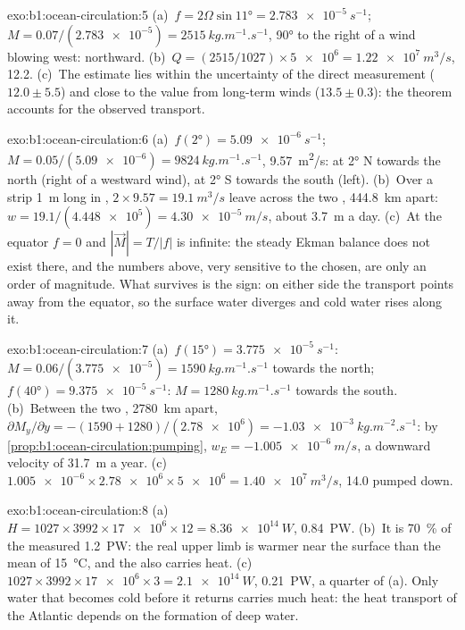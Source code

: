 \begin{solution}{exo:b1:ocean-circulation:5}
(a)~$f = 2\Omega\sin\ang{11} = \qty{2.783e-5}{s^{-1}}$; $M = 0.07/(\num{2.783e-5}) =
\qty{2515}{kg.m^{-1}.s^{-1}}$, \ang{90} to the right of a wind blowing west:
northward. (b)~$Q = (2515/1027) \times \num{5e6} = \qty{1.22e7}{m^3/s}$,
\qty{12.2}{\sverdrup}. (c)~The estimate lies within the uncertainty of the direct
measurement ($12.0 \pm 5.5$) and close to the value from long-term winds
($13.5 \pm 0.3$): the theorem accounts for the observed transport.
\end{solution}

\begin{solution}{exo:b1:ocean-circulation:6}
(a)~$f(\ang{2}) = \qty{5.09e-6}{s^{-1}}$; $M = 0.05/(\num{5.09e-6}) =
\qty{9824}{kg.m^{-1}.s^{-1}}$, \qty{9.57}{m^2/s}: at \ang{2} N towards the north
(right of a westward wind), at \ang{2} S towards the south (left). (b)~Over a strip
\qty{1}{m} long in , $2 \times 9.57 = \qty{19.1}{m^3/s}$ leave across the
two , \qty{444.8}{km} apart: $w = 19.1/(\num{4.448e5}) = \qty{4.30e-5}{m/s}$,
about \qty{3.7}{m} a day. (c)~At the equator $f = 0$ and $|\vec M| = T/|f|$ is
infinite: the steady Ekman balance does not exist there, and the numbers above, very
sensitive to the  chosen, are only an order of magnitude. What survives is
the sign: on either side the transport points away from the equator, so the surface
water diverges and cold water rises along it.
\end{solution}

\begin{solution}{exo:b1:ocean-circulation:7}
(a)~$f(\ang{15}) = \qty{3.775e-5}{s^{-1}}$: $M = 0.06/(\num{3.775e-5}) =
\qty{1590}{kg.m^{-1}.s^{-1}}$ towards the north; $f(\ang{40}) =
\qty{9.375e-5}{s^{-1}}$: $M = \qty{1280}{kg.m^{-1}.s^{-1}}$ towards the south.
(b)~Between the two , \qty{2780}{km} apart, $\partial M_y/\partial y =
-(1590 + 1280)/(\num{2.78e6}) = \qty{-1.03e-3}{kg.m^{-2}.s^{-1}}$: by
\cref{prop:b1:ocean-circulation:pumping}, $w_E = \qty{-1.005e-6}{m/s}$, a downward
velocity of \qty{31.7}{m} a year. (c)~$\num{1.005e-6} \times \num{2.78e6} \times
\num{5e6} = \qty{1.40e7}{m^3/s}$, \qty{14.0}{\sverdrup} pumped down.
\end{solution}

\begin{solution}{exo:b1:ocean-circulation:8}
(a)~$H = 1027 \times 3992 \times \num{17e6} \times 12 = \qty{8.36e14}{W}$,
\qty{0.84}{PW}. (b)~It is \qty{70}{\percent} of the measured \qty{1.2}{PW}: the real
upper limb is warmer near the surface than the mean of \qty{15}{\celsius}, and the
 also carries heat. (c)~$1027 \times 3992 \times \num{17e6} \times 3 =
\qty{2.1e14}{W}$, \qty{0.21}{PW}, a quarter of (a). Only water that becomes cold
before it returns carries much heat: the heat transport of the Atlantic depends on
the formation of deep water.
\end{solution}

